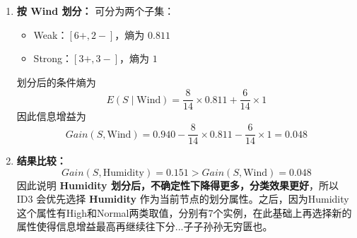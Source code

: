 \documentclass[../main.tex]{subfiles}
\begin{document}
\begin{enumerate}
{\begin{enumerate}
        \item \textbf{按 Wind 划分：}
        可分为两个子集：
        \begin{itemize}
            \item Weak：$[6+,2-]$，熵为 $0.811$
            \item Strong：$[3+,3-]$，熵为 $1$
        \end{itemize}
        划分后的条件熵为
        $$
        E(S\mid \text{Wind})=\frac{8}{14}\times 0.811+\frac{6}{14}\times 1
        $$
        因此信息增益为
        $$
        Gain(S,\text{Wind})=0.940-\frac{8}{14}\times 0.811-\frac{6}{14}\times 1=0.048
        $$
    
        \item \textbf{结果比较：}
        $$
        Gain(S,\text{Humidity})=0.151 > Gain(S,\text{Wind})=0.048
        $$
        因此说明 \textbf{Humidity 划分后，不确定性下降得更多，分类效果更好}，所以 ID3 会优先选择 \textbf{Humidity} 作为当前节点的划分属性。之后，因为Humidity这个属性有High和Normal两类取值，分别有7个实例，在此基础上再选择新的属性使得信息增益最高再继续往下分...子子孙孙无穷匮也。
    \end{enumerate}
    }
\end{enumerate}
\end{document}
